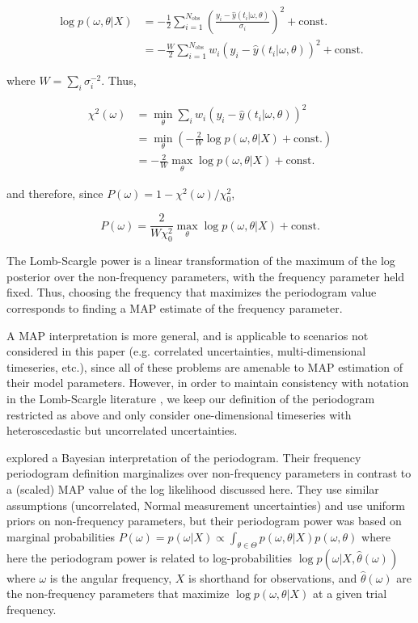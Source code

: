 \documentclass[apj]{emulateapj}
\begin{document}
\begin{align}
    \log p(\omega, \theta|X) &= -\frac{1}{2}\sum_{i=1}^{N_{\mathrm{obs}}}\left(\frac{y_i - \hat{y}(t_i | \omega, \theta)}{\sigma_i}\right)^2 + \mathrm{const.}\\
                             &= -\frac{W}{2}\sum_{i=1}^{N_{\mathrm{obs}}}w_i (y_i - \hat{y}(t_i | \omega, \theta))^2 + \mathrm{const.}
\end{align}

where $W= \sum_i \sigma_i^{-2}$. Thus, 

\begin{align}
    \chi^2(\omega) &= \min_{\theta} \sum_i w_i (y_i - \hat{y}(t_i|\omega, \theta))^2\\
                   &= \min_{\theta}\left(-\frac{2}{W}\log p(\omega, \theta|X) + \mathrm{const.}\right)\\
                   &= -\frac{2}{W}\max_\theta \log p(\omega, \theta|X) + \mathrm{const.}
\end{align}

and therefore, since $P(\omega) = 1 - \chi^2(\omega) / \chi_0^2$,

\begin{equation}
\label{eq:lsismap}
    P(\omega) = \frac{2}{W\chi_0^2} \max_\theta \log p(\omega, \theta|X) + \mathrm{const.}
\end{equation}

The Lomb-Scargle power is a linear transformation of the maximum of the log posterior over the non-frequency parameters, with the frequency parameter held fixed. Thus, choosing the frequency that maximizes the periodogram value corresponds to finding a MAP estimate of the frequency parameter.

A MAP interpretation is more general, and is applicable to scenarios not considered in this paper (e.g. correlated uncertainties, multi-dimensional timeseries, etc.), since all of these problems are amenable to MAP estimation of their model parameters. However, in order to maintain consistency with notation in the Lomb-Scargle literature \citep[e.g.][]{Zechmeister+Kurster_2009,Vanderplas_2018}, we keep our definition of the periodogram restricted as above and only consider one-dimensional timeseries with heteroscedastic but uncorrelated uncertainties.

\cite{Mortier_et_al_2015,Mortier_et_al_2015_code} explored a Bayesian interpretation of the periodogram. 
Their frequency periodogram definition marginalizes over non-frequency parameters in contrast to a 
(scaled) MAP value of the log likelihood discussed here. They use similar assumptions (uncorrelated, 
Normal measurement uncertainties) and use uniform priors on non-frequency parameters, but their 
periodogram power was based on marginal probabilities 
$P(\omega) = p(\omega|X) \propto \int_{\theta \in \Theta} p(\omega, \theta|X)p(\omega, \theta)$ 
where here the periodogram power is related to log-probabilities $\log p(\omega|X, \hat{\theta}(\omega))$ 
where $\omega$ is the angular frequency, $X$ is shorthand for observations, 
and $\hat{\theta}(\omega)$ are the non-frequency parameters that 
maximize $\log p(\omega, \theta|X)$ at a given trial frequency. 
\end{document}
